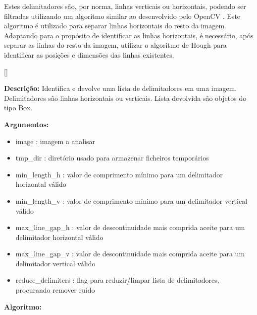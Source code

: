 Estes delimitadores são, por norma, linhas verticais ou horizontais, podendo ser filtradas utilizando um algoritmo similar ao desenvolvido pelo OpenCV \citep{cv_extract_lines}. Este algoritmo é utilizado para separar linhas horizontais do resto da imagem. Adaptando para o propósito de identificar as linhas horizontais, é necessário, após separar as linhas do resto da imagem, utilizar o algoritmo de Hough para identificar as posições e dimensões das linhas existentes.

[\normalsize]

\textbf{Descrição:} Identifica e devolve uma lista de delimitadores em uma imagem. Delimitadores são linhas horizontais ou verticais. Lista devolvida são objetos do tipo Box.


\textbf{Argumentos:}
\begin{itemize}\setlength\itemsep{-0.3em}
	\vspace{-0.5em}
	\item image : imagem a analisar
	\item tmp\_dir : diretório usado para armazenar ficheiros temporários
	\item min\_length\_h : valor de comprimento mínimo para um delimitador horizontal válido
	\item min\_length\_v : valor de comprimento mínimo para um delimitador vertical válido
	\item max\_line\_gap\_h : valor de descontinuidade mais comprida aceite para um delimitador horizontal válido
	\item max\_line\_gap\_v : valor de descontinuidade mais comprida aceite para um delimitador vertical válido
	\item reduce\_delimiters : flag para reduzir/limpar lista de delimitadores, procurando remover ruído
\end{itemize}

\textbf{Algoritmo:}


